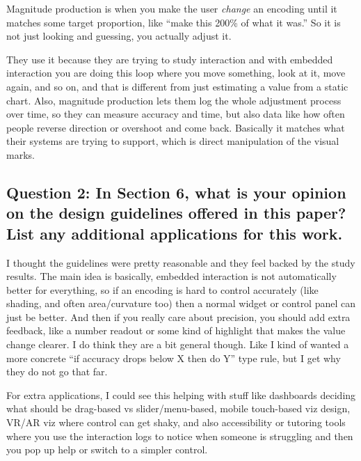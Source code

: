 \documentclass[11pt]{article}
\begin{document}
Magnitude production is when you make the user \emph{change} an encoding until it matches some target proportion, like “make this 200\% of what it was.” So it is not just looking and guessing, you actually adjust it.

They use it because they are trying to study interaction and with embedded interaction you are doing this loop where you move something, look at it, move again, and so on, and that is different from just estimating a value from a static chart. Also, magnitude production lets them log the whole adjustment process over time, so they can measure accuracy and time, but also data like how often people reverse direction or overshoot and come back. Basically it matches what their systems are trying to support, which is direct manipulation of the visual marks.

\subsection*{Question 2: In Section 6, what is your opinion on the design guidelines offered in this paper? List any additional applications for this work.}

I thought the guidelines were pretty reasonable and they feel backed by the study results. The main idea is basically, embedded interaction is not automatically better for everything, so if an encoding is hard to control accurately (like shading, and often area/curvature too) then a normal widget or control panel can just be better. And then if you really care about precision, you should add extra feedback, like a number readout or some kind of highlight that makes the value change clearer. I do think they are a bit general though. Like I kind of wanted a more concrete “if accuracy drops below X then do Y” type rule, but I get why they do not go that far.

For extra applications, I could see this helping with stuff like dashboards deciding what should be drag-based vs slider/menu-based, mobile touch-based viz design, VR/AR viz where control can get shaky, and also accessibility or tutoring tools where you use the interaction logs to notice when someone is struggling and then you pop up help or switch to a simpler control.
\end{document}
